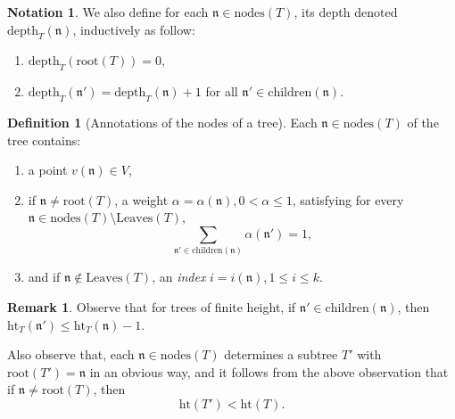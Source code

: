 \documentclass[10pt]{amsart}
\theoremstyle{plain}
\theoremstyle{definition}
\newtheorem{definition}[lemma]{Definition}
\newtheorem{notation}[lemma]{Notation}
\newtheorem{remark}[lemma]{Remark}
\let\leq\leqslant
\begin{document}
\begin{notation}
We also define for each $\mathfrak{n} \in \mathrm{nodes}(T)$, its depth
denoted $\mathrm{depth}_T(\mathfrak{n})$, inductively as follow:

\begin{enumerate}
    \item $\mathrm{depth}_T(\mathrm{root}(T)) = 0$, 
    \item $\mathrm{depth}_T(\mathfrak{n}') = \mathrm{depth}_T(\mathfrak{n})+1$
    for all $\mathfrak{n}' \in \mathrm{children}(\mathfrak{n})$.
\end{enumerate}
\end{notation}

\begin{definition}[Annotations of the nodes of a tree]
Each $\mathfrak{n} \in \mathrm{nodes}(T)$ of the tree contains:
\begin{enumerate}
    \item a point  $v(\mathfrak{n}) \in V$,
    
    \item if $\mathfrak{n} \neq \mathrm{root}(T)$,
a weight $\alpha = \alpha(\mathfrak{n}), 0< \alpha \leq 1$, 
satisfying for every $\mathfrak{n} \in \mathrm{nodes}(T) \setminus \mathrm{Leaves}(T)$,
\[
\sum_{\mathfrak{n}' \in \mathrm{children}(\mathfrak{n})} \alpha(\mathfrak{n}') = 1,
\]
    
    \item and if $\mathfrak{n} \not\in \mathrm{Leaves}(T)$,
an \emph{index}  $i = i(\mathfrak{n}), 1 \leq i \leq k$.
\end{enumerate}
\end{definition}

\begin{remark}
\label{rem:subtree}
Observe that for trees of finite height, if $\mathfrak{n'} \in \mathrm{children}(\mathfrak{n})$, then $\mathrm{ht}_T(\mathfrak{n}') \leq  \mathrm{ht}_T(\mathfrak{n}) - 1$.

Also observe that, each $\mathfrak{n} \in \mathrm{nodes}(T)$ 
determines a subtree $T'$
with $\mathrm{root}(T') = \mathfrak{n}$ in an obvious way, and it follows from the above observation that if $\mathfrak{n} \neq \mathrm{root}(T)$, then 
\[
\mathrm{ht}(T') < \mathrm{ht}(T). 
\]
\end{remark}
\end{document}
